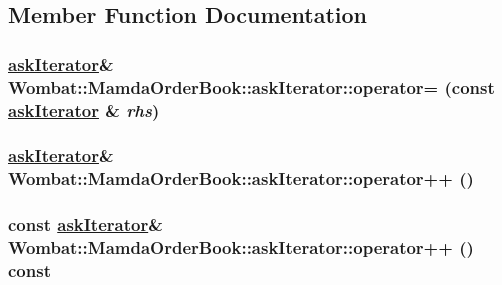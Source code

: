 \subsection{Member Function Documentation}
\hypertarget{classWombat_1_1MamdaOrderBook_1_1askIterator_4cc5e66440e8009e1e7eb50bc2d9d539}{
\subsubsection[operator=]{\setlength{\rightskip}{0pt plus 5cm}\hyperlink{classWombat_1_1MamdaOrderBook_1_1askIterator}{ask\-Iterator}\& Wombat::Mamda\-Order\-Book::ask\-Iterator::operator= (const \hyperlink{classWombat_1_1MamdaOrderBook_1_1askIterator}{ask\-Iterator} \& {\em rhs})}}
\label{classWombat_1_1MamdaOrderBook_1_1askIterator_4cc5e66440e8009e1e7eb50bc2d9d539}


\hypertarget{classWombat_1_1MamdaOrderBook_1_1askIterator_75e112d63ea19653bf89d4013fa8682d}{
\subsubsection[operator++]{\setlength{\rightskip}{0pt plus 5cm}\hyperlink{classWombat_1_1MamdaOrderBook_1_1askIterator}{ask\-Iterator}\& Wombat::Mamda\-Order\-Book::ask\-Iterator::operator++ ()}}
\label{classWombat_1_1MamdaOrderBook_1_1askIterator_75e112d63ea19653bf89d4013fa8682d}


\hypertarget{classWombat_1_1MamdaOrderBook_1_1askIterator_66e4059fe31cf7c2b74dc184caeed580}{
\subsubsection[operator++]{\setlength{\rightskip}{0pt plus 5cm}const \hyperlink{classWombat_1_1MamdaOrderBook_1_1askIterator}{ask\-Iterator}\& Wombat::Mamda\-Order\-Book::ask\-Iterator::operator++ () const}}
\label{classWombat_1_1MamdaOrderBook_1_1askIterator_66e4059fe31cf7c2b74dc184caeed580}


